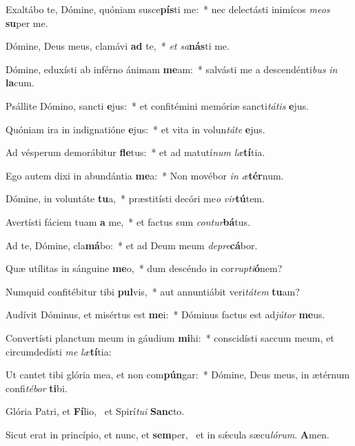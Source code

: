 \item Exaltábo te, Dómine, quóniam susce\textbf{pís}ti me:~* nec delectásti inimícos \textit{me}\textit{os} \textbf{su}per me.
\item Dómine, Deus meus, clamávi \textbf{ad} te,~* \textit{et} \textit{sa}\textbf{nás}ti me.
\item Dómine, eduxísti ab inférno ánimam \textbf{me}am:~* salvásti me a descendénti\textit{bus} \textit{in} \textbf{la}cum.
\item Psállite Dómino, sancti \textbf{e}jus:~* et confitémini memóriæ sancti\textit{tá}\textit{tis} \textbf{e}jus.
\item Quóniam ira in indignatióne \textbf{e}jus:~* et vita in volun\textit{tá}\textit{te} \textbf{e}jus.
\item Ad vésperum demorábitur \textbf{fle}tus:~* et ad matutí\textit{num} \textit{læ}\textbf{tí}tia.
\item Ego autem dixi in abundántia \textbf{me}a:~* Non movébor \textit{in} \textit{æ}\textbf{tér}num.
\item Dómine, in voluntáte \textbf{tu}a,~* præstitísti decóri me\textit{o} \textit{vir}\textbf{tú}tem.
\item Avertísti fáciem tuam \textbf{a} me,~* et factus sum \textit{con}\textit{tur}\textbf{bá}tus.
\item Ad te, Dómine, cla\textbf{má}bo:~* et ad Deum meum \textit{de}\textit{pre}\textbf{cá}bor.
\item Quæ utílitas in sánguine \textbf{me}o,~* dum descéndo in cor\textit{rup}\textit{ti}\textbf{ó}nem?
\item Numquid confitébitur tibi \textbf{pul}vis,~* aut annuntiábit veri\textit{tá}\textit{tem} \textbf{tu}am?
\item Audívit Dóminus, et misértus est \textbf{me}i:~* Dóminus factus est ad\textit{jú}\textit{tor} \textbf{me}us.
\item Convertísti planctum meum in gáudium \textbf{mi}hi:~* conscidísti saccum meum, et circumdedísti \textit{me} \textit{læ}\textbf{tí}tia:
\item Ut cantet tibi glória mea, et non com\textbf{pún}gar:~* Dómine, Deus meus, in ætérnum confi\textit{té}\textit{bor} \textbf{ti}bi.
\item Glória Patri, et \textbf{Fí}lio,~\psstar{} et Spirí\textit{tu}\textit{i} \textbf{Sanc}to.
\item Sicut erat in princípio, et nunc, et \textbf{sem}per,~\psstar{} et in sǽcula sæcu\textit{ló}\textit{rum}. \textbf{A}men.
